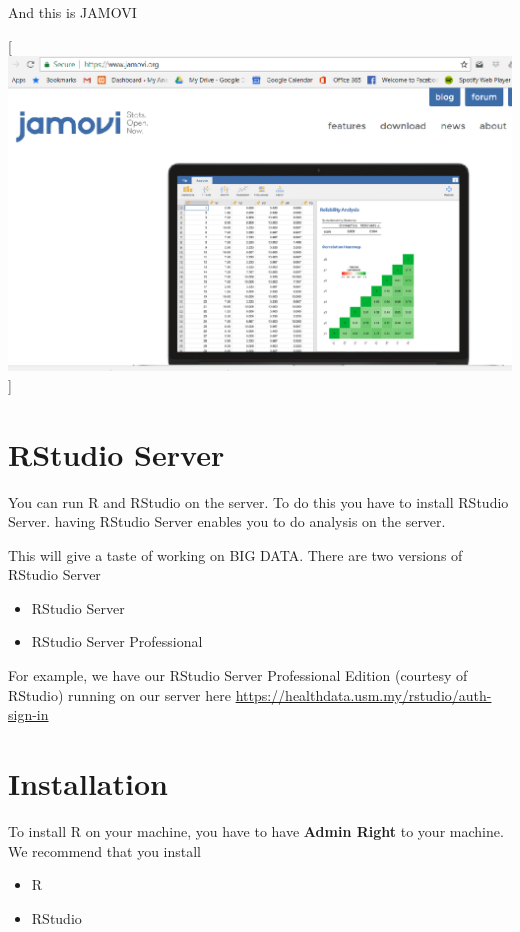\documentclass[
]{book}
\providecommand{\tightlist}{%
  \setlength{\itemsep}{0pt}\setlength{\parskip}{0pt}}
\begin{document}
And this is JAMOVI

{[}\includegraphics{jamovi.PNG}{]}

\hypertarget{rstudio-server}{%
\section{RStudio Server}\label{rstudio-server}}

You can run R and RStudio on the server. To do this you have to install RStudio Server. having RStudio Server enables you to do analysis on the server.

This will give a taste of working on BIG DATA. There are two versions of RStudio Server

\begin{itemize}
\tightlist
\item
  RStudio Server
\item
  RStudio Server Professional
\end{itemize}

For example, we have our RStudio Server Professional Edition (courtesy of RStudio) running on our server here \url{https://healthdata.usm.my/rstudio/auth-sign-in}

\hypertarget{installation}{%
\section{Installation}\label{installation}}

To install R on your machine, you have to have \textbf{Admin Right} to your machine. We recommend that you install

\begin{itemize}
\tightlist
\item
  R
\item
  RStudio
\end{itemize}
\end{document}
